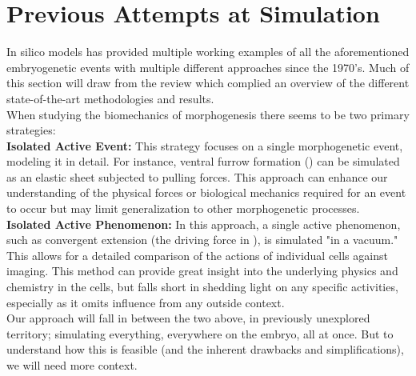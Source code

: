 \newpage
\section{Previous Attempts at Simulation}
In silico models has provided multiple working examples of all the aforementioned embryogenetic events with multiple different approaches since the 1970's. Much of this section will draw from the review  which complied an overview of the different state-of-the-art methodologies and results. \\
When studying the biomechanics of morphogenesis there seems to be two primary strategies:\\

\textbf{Isolated Active Event:} This strategy focuses on a single morphogenetic event, modeling it in detail. For instance, ventral furrow formation () can be simulated as an elastic sheet subjected to pulling forces. This approach can enhance our understanding of the physical forces or biological mechanics required for an event to occur but may limit generalization to other morphogenetic processes.\\

\textbf{Isolated Active Phenomenon:} In this approach, a single active phenomenon, such as convergent extension (the driving force in ), is simulated "in a vacuum." This allows for a detailed comparison of the actions of individual cells against imaging. This method can provide great insight into the underlying physics and chemistry in the cells, but falls short in shedding light on any specific activities, especially as it omits influence from any outside context.\\

Our approach will fall in between the two above, in previously unexplored territory; simulating everything, everywhere on the embryo, all at once. But to understand how this is feasible (and the inherent drawbacks and simplifications), we will need more context.\\


